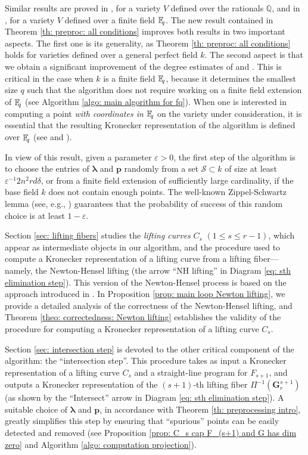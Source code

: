 \documentclass[pdflatex,sn-basic]{sn-jnl}%
\theoremstyle{thmstyleone}%
\theoremstyle{thmstyletwo}%
\theoremstyle{thmstylethree}%
\theoremstyle{definition}
\numberwithin{equation}{section}
\newcommand{\bfs}{\boldsymbol}
\newcommand{\F}{\mathbb F}
\newcommand{\Q}{\mathbb Q}
\newcommand{\fq}{\F_{\hskip-0.7mm q}}
\begin{document}
Similar results are proved in \cite[Theorem 3]{HeMaWa01}, for a
variety $V$ defined over the rationals $\Q$, and in
\cite[Theorem 3.3]{CaMa06a}, for a variety $V$ defined over a
finite field $\fq$. The new result contained in Theorem \ref{th: preproc: all conditions}
improves both results in two important aspects. The first
one is its generality, as Theorem \ref{th: preproc: all conditions} holds for varieties
defined over a general perfect field $k$. The second aspect
is that we obtain a significant improvement of the degree
estimates of \cite[Theorem 3]{HeMaWa01} and \cite[Theorem 3.3]{CaMa06a}.
This is critical in the case when $k$ is a finite field $\fq$,
because it determines the smallest size $q$ such that the
algorithm does not require working on a finite field extension
of $\fq$ (see Algorithm \ref{algo: main algorithm for fq}).  When one is interested in computing
a point {\em with coordinates in $\fq$} on the variety under
consideration, it is essential that the resulting Kronecker representation
of the algorithm is defined over $\fq$ (see \cite{CaMa06a} and
\cite{GiMaPePr23b}).

In view of this result, given a parameter $\varepsilon>0$, the first step of the algorithm
is to choose the entries
of $\bfs\lambda$ and $\bfs p$ randomly from a set $\mathcal{S}\subset k$ of size
at least $\varepsilon^{-1}2n^2rd\delta$, or from a finite field extension
of sufficiently large cardinality, if the base field $k$ does not contain
enough points. The well-known
Zippel-Schwartz lemma (see, e.g., \cite[Lemma 6.44]{GaGe99}) guarantees
that the probability of success of this random choice is at least $1-\varepsilon$.

Section \ref{sec: lifting fibers} studies the {\em lifting curves} $C_s$
$(1\le s\le r-1)$, which appear as intermediate objects in our algorithm,
and the procedure used to compute a Kronecker representation of a
lifting curve from a lifting fiber---namely, the Newton-Hensel lifting (the
arrow ``NH lifting''
in Diagram \ref{eq: sth elimination step}). This version of the
Newton-Hensel process is based on the approach introduced in \cite{GiLeSa01}. In
Proposition \ref{prop: main loop Newton lifting}, we provide
a detailed analysis of the correctness of the Newton-Hensel lifting,
and Theorem \ref{theo: correctedness: Newton lifting} establishes the
validity of the procedure
for computing a Kronecker representation of a lifting curve $C_s$.

Section \ref{sec: intersection step} is devoted to the other
critical component of the algorithm:
the ``intersection step''. This procedure takes as input a Kronecker representation
of a lifting curve $C_s$ and a straight-line program for $F_{s+1}$,
and outputs a Kronecker representation of the $(s+1)$-th lifting fiber
$\Pi^{-1}(\bfs G_r^{s+1})$ (as shown by the ``Intersect'' arrow
in Diagram \ref{eq: sth elimination step}). A suitable choice
of $\bfs \lambda$ and $\bfs p$, in accordance with Theorem \ref{th: preprocessing intro},
greatly simplifies this
step by ensuring that ``spurious'' points can be easily detected and
removed (see Proposition \ref{prop: C_s cap F_(s+1) and G has dim zero}
and Algorithm \ref{algo: computation projection}).
\end{document}

